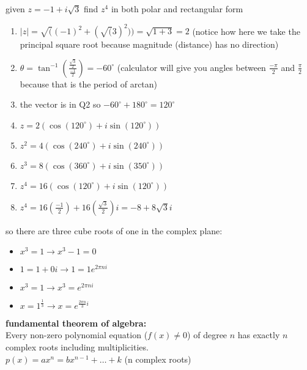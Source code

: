 \documentclass{article}
\begin{document}
given $z = -1 + i\sqrt{3}$ find $z^4$ in both polar and rectangular form
	\begin{enumerate}
		\item $\lvert z\rvert = \sqrt((-1)^2 + (\sqrt(3)^2)) = \sqrt{1 + 3} = 2$ (notice how here we take the principal square root because magnitude (distance) has no direction)
		\item $\theta = \tan^{-1}(\frac{\frac{\sqrt{3}}{2}}{\frac{-1}{2}}) = -60^{\circ}$ (calculator will give you angles between $\frac{-\pi}{2}$ and $\frac{\pi}{2}$ because that is the period of arctan)
		\item the vector is in Q2 so $-60^{\circ} + 180^{\circ} = 120^{\circ}$
		\item $z = 2(\cos(120^{\circ}) + i\sin(120^{\circ}))$
		\item $z^2 = 4(\cos(240^{\circ}) + i\sin(240^{\circ}))$		
		\item $z^3 = 8(\cos(360^{\circ}) + i\sin(350^{\circ}))$
		\item $z^4 = 16(\cos(120^{\circ}) + i\sin(120^{\circ}))$
		\item $z^4 = 16(\frac{-1}{2}) + 16(\frac{\sqrt{3}}{2})i = -8 + 8\sqrt{3}i$
	\end{enumerate}

so there are three cube roots of one in the complex plane:\\
	\begin{itemize}
		\item $x^3 = 1 \to x^3 - 1 = 0$ 
		\item $1 = 1 + 0i \to 1 = 1e^{2\pi ni}$
		\item $x^3 = 1 \to x^3 = e^{2\pi ni}$
		\item $x = 1^{\frac{1}{3}} \to x = e^{\frac{2\pi n}{3}i}$
	\end{itemize}

\textbf{fundamental theorem of algebra:}\\

Every non-zero polynomial equation ($f(x) \neq 0$) of degree $n$ has exactly $n$ complex roots including multiplicities.\\

$p(x) = ax^n = bx^{n-1} + \dots + k$ (n complex roots)\\
\end{document}
